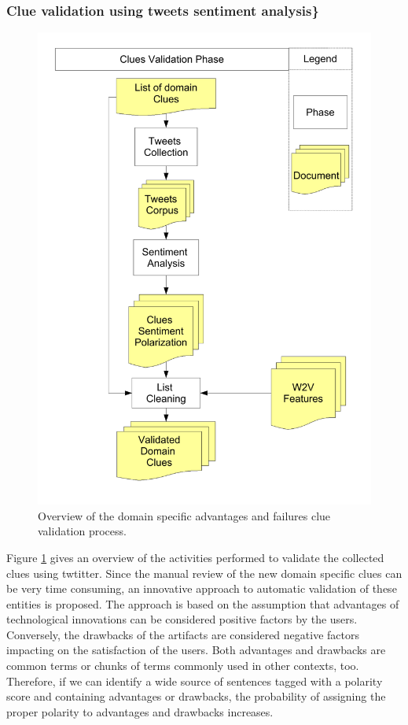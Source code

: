\documentclass[]{book}
\begin{document}
\subsubsection{Clue validation using tweets sentiment
analysis\}}\label{clue-validation-using-tweets-sentiment-analysis}

\begin{figure}

{\centering \includegraphics[width=0.8\linewidth]{_bookdown_files/figures/pointer-validation-phase} 

}

\caption{Overview of the domain specific advantages and failures clue validation process.}\label{fig:advdrwarticleprocessfigcluevalidationphase}
\end{figure}

Figure \ref{fig:advdrwarticleprocessfigcluevalidationphase} gives an
overview of the activities performed to validate the collected clues
using twtitter. Since the manual review of the new domain specific clues
can be very time consuming, an innovative approach to automatic
validation of these entities is proposed. The approach is based on the
assumption that advantages of technological innovations can be
considered positive factors by the users. Conversely, the drawbacks of
the artifacts are considered negative factors impacting on the
satisfaction of the users. Both advantages and drawbacks are common
terms or chunks of terms commonly used in other contexts, too.
Therefore, if we can identify a wide source of sentences tagged with a
polarity score and containing advantages or drawbacks, the probability
of assigning the proper polarity to advantages and drawbacks increases.
\end{document}
